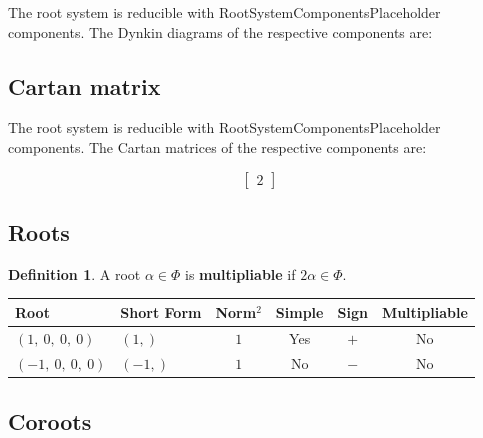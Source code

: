 \documentclass[11pt]{article}
\newcommand{\noi}{\noindent}
\newcommand{\tbf}{\textbf}
\theoremstyle{definition}
\newtheorem{definition}{Definition}[section]
\newif\ifrootsystemirreducible
\begin{document}
\ifrootsystemirreducible
The root system is irreducible and has Dynkin diagram:
\else
The root system is reducible with RootSystemComponentsPlaceholder components. The Dynkin diagrams of the respective components are:
\fi

\begin{center}
\end{center}

\subsection{Cartan matrix}

\ifrootsystemirreducible
The root system is irreducible and has Cartan matrix:
\else
The root system is reducible with RootSystemComponentsPlaceholder components. The Cartan matrices of the respective components are:
\fi

\[
\left[\begin{matrix}2\end{matrix}\right]
\]

\subsection{Roots}

\begin{definition}
A root $\alpha \in \Phi$ is \tbf{multipliable} if $2\alpha \in \Phi$.
\end{definition}

\noi \begin{tabular}{|l|l|c|c|c|c|}
    \hline
    \textbf{Root} & \textbf{Short Form} & \textbf{Norm$^2$} & \textbf{Simple} & \textbf{Sign} & \textbf{Multipliable} \\
    \hline
    $\left( 1, \  0, \  0, \  0\right)$ & $\left( 1,\right)$ & $1$ & Yes & $+$ & No \\
    \hline
    $\left( -1, \  0, \  0, \  0\right)$ & $\left( -1,\right)$ & $1$ & No & $-$ & No \\
    \hline
\end{tabular}


\subsection{Coroots}
\end{document}
